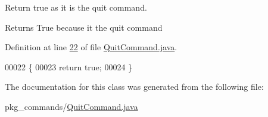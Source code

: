 Return true as it is the quit command. 

\begin{DoxyReturn}{Returns}
True because it the quit command 
\end{DoxyReturn}


Definition at line \hyperlink{QuitCommand_8java_source_l00022}{22} of file \hyperlink{QuitCommand_8java_source}{Quit\-Command.\-java}.


\begin{DoxyCode}
00022                                           \{
00023         \textcolor{keywordflow}{return} \textcolor{keyword}{true};
00024     \}
\end{DoxyCode}


The documentation for this class was generated from the following file\-:\begin{DoxyCompactItemize}
\item 
pkg\-\_\-commands/\hyperlink{QuitCommand_8java}{Quit\-Command.\-java}\end{DoxyCompactItemize}
